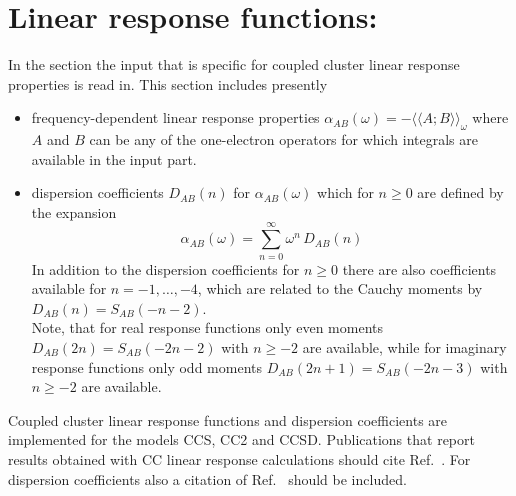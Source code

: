 
\section{Linear response functions: }\label{sec:cclr}
In the  section the input that is
specific for coupled cluster linear response properties is read in. 
This section includes presently 
\begin{itemize}
\item frequency-dependent linear response properties 
      $\alpha_{AB}(\omega)  = - \langle\langle A; B \rangle\rangle_\omega$
      where $A$ and $B$ can be any of the one-electron
      operators for which integrals are available in the 
       input part.
\item dispersion coefficients $D_{AB}(n)$ for $\alpha_{AB}(\omega)$
      which for $n \ge 0$ are defined by the expansion
      $$ \alpha_{AB}(\omega) = \sum_{n=0}^{\infty} \omega^n \, D_{AB}(n) $$
      In addition to the dispersion coefficients for $n \ge 0$
      there are also coefficients available for $ n = -1, \ldots, -4$,
      which are related to the Cauchy moments by $ D_{AB}(n) = S_{AB}(-n-2)$.
      \\
      Note, that for real response functions only even moments
      $D_{AB}(2n) = S_{AB}(-2n-2)$ with $n \ge -2$ are available,
      while for imaginary response functions only odd moments
      $D_{AB}(2n+1) = S_{AB}(-2n-3)$ with $n \ge -2$ are available.
\end{itemize}
Coupled cluster linear response functions and dispersion coefficients
are implemented for the models CCS, CC2 and CCSD. 
Publications that report results obtained with CC linear response
calculations should cite Ref.\ \cite{Christiansen:CCLR}. 
For dispersion coefficients also a citation of Ref.\ \cite{Haettig:CAUCHY} 
should be included.

